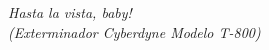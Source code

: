 \begin{epigrafe}
    \vspace*{\fill}
    \begin{flushright}
        \textit{Hasta la vista, baby!\\
        (Exterminador Cyberdyne Modelo T-800)}
    \end{flushright}
\end{epigrafe}